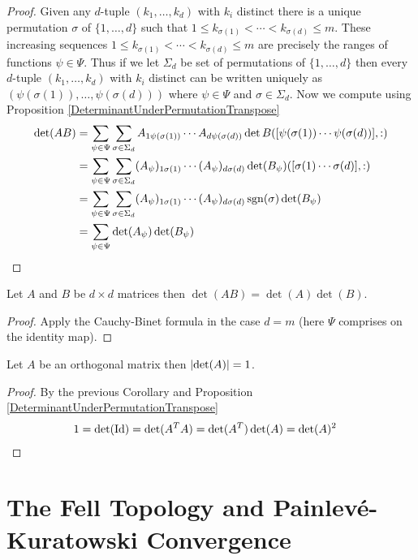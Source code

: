 \begin{proof}
Given any $d$-tuple $(k_1, \dotsc, k_d)$ with $k_i$ distinct there is a unique permutation $\sigma$ of $\lbrace 1 , \dotsc, d \rbrace$ such that $1 \leq k_{\sigma(1)} < \dotsb < k_{\sigma(d)} \leq m$. These increasing sequences $1 \leq k_{\sigma(1)} < \dotsb < k_{\sigma(d)} \leq m$ are precisely the ranges of functions $\psi \in \Psi$.   Thus if we let $\Sigma_d$ be set of permutations of $\lbrace 1, \dotsc, d \rbrace$ then every $d$-tuple $(k_1, \dotsc, k_d)$ with $k_i$ distinct can be written uniquely as $(\psi(\sigma(1)), \dotsc, \psi(\sigma(d)))$ where $\psi \in \Psi$ and $\sigma \in \Sigma_d$.  Now we compute using Proposition \ref{DeterminantUnderPermutationTranspose}
\begin{align*}
\det(AB) 
&= \sum_{\psi \in \Psi} \sum_{\sigma \in \Sigma_d} A_{1 \psi(\sigma(1))}  \dotsb A_{d \psi(\sigma(d))} \det B([\psi(\sigma(1)) \dotsb \psi(\sigma(d)) ], :) \\
&= \sum_{\psi \in \Psi} \sum_{\sigma \in \Sigma_d} (A_\psi)_{1 \sigma(1)}  \dotsb (A_\psi)_{d \sigma(d)} \det (B_\psi) ([\sigma(1) \dotsb \sigma(d) ], :) \\
&= \sum_{\psi \in \Psi} \sum_{\sigma \in \Sigma_d} (A_\psi)_{1 \sigma(1)}  \dotsb (A_\psi)_{d \sigma(d)} \operatorname*{sgn}(\sigma) \det (B_\psi) \\
&= \sum_{\psi \in \Psi} \det(A_\psi) \det(B_\psi)
\end{align*}
\end{proof}

\begin{cor}\label{DeterminantOfProducts}Let $A$ and $B$ be $d \times d$ matrices then $\det(AB) = \det(A) \det(B)$.
\end{cor}
\begin{proof}
Apply the Cauchy-Binet formula in the case $d=m$ (here $\Psi$ comprises on the identity map).
\end{proof}

\begin{cor}Let $A$ be an orthogonal matrix then $\left \vert \det(A) \right \vert = 1$.
\end{cor}
\begin{proof}
By the previous Corollary and  Proposition \ref{DeterminantUnderPermutationTranspose}
\begin{align*}
1 &= \det(\operatorname*{Id}) = \det(A^T A) = \det(A^T) \det(A) = \det(A)^2
\end{align*}
\end{proof}

\section{The Fell Topology and Painlev\'{e}-Kuratowski Convergence}

